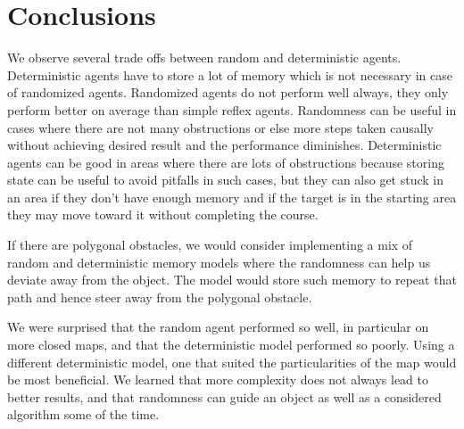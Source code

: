 \documentclass[12pt]{article}
\begin{document}
\section{Conclusions}
We observe several trade offs between random and deterministic agents.
Deterministic agents have to store a lot of memory which is not
necessary in case of randomized agents.
Randomized agents do not perform well always, they only perform
better on average than simple reflex agents.
Randomness can be useful in cases where there are not many
obstructions or else more steps taken causally without achieving
desired result and the performance diminishes.
Deterministic agents can be good in areas where there are lots of
obstructions because storing state can be useful to avoid pitfalls in
such cases, but they can also get stuck in an area if they don't have enough memory and if the target is in the starting area they may move toward it without completing the course.

If there are polygonal obstacles, we would consider implementing a mix of
random and deterministic memory models where the randomness can help us
deviate away from the object. The model would store such memory to repeat
that path and hence steer away from the polygonal obstacle.

We were surprised that the random agent performed so well, in particular on more closed maps, and that the deterministic model performed so poorly.
Using a different deterministic model, one that suited the particularities of the map would be most beneficial.
We learned that more complexity does not always lead to better results, and that randomness can guide an object as well as a considered algorithm some of the time.

\newpage


\end{document}
